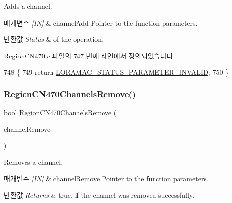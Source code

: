 Adds a channel. 


\begin{DoxyParams}{매개변수}
{\em \mbox{[}\+I\+N\mbox{]}} & channel\+Add Pointer to the function parameters.\\
\hline
\end{DoxyParams}

\begin{DoxyRetVals}{반환값}
{\em Status} & of the operation. \\
\hline
\end{DoxyRetVals}


Region\+C\+N470.\+c 파일의 747 번째 라인에서 정의되었습니다.


\begin{DoxyCode}
748 \{
749     \textcolor{keywordflow}{return} \mbox{\hyperlink{group___l_o_r_a_m_a_c_gga1d18f26b344040b3ec5c3db662919661ad0d3119f247d00e1787dda106fcb3017}{LORAMAC\_STATUS\_PARAMETER\_INVALID}};
750 \}
\end{DoxyCode}
\mbox{\label{group___r_e_g_i_o_n_c_n470_ga325aac904d27927672021106fc718f09}} 
\subsubsection{\texorpdfstring{Region\+C\+N470\+Channels\+Remove()}{RegionCN470ChannelsRemove()}}
{\footnotesize\ttfamily bool Region\+C\+N470\+Channels\+Remove (\begin{DoxyParamCaption}\item[{\mbox{\hyperlink{group___r_e_g_i_o_n_gaa37468560d2fc81a977b57a48e5d72c0}{Channel\+Remove\+Params\+\_\+t}} $\ast$}]{channel\+Remove }\end{DoxyParamCaption})}



Removes a channel. 


\begin{DoxyParams}{매개변수}
{\em \mbox{[}\+I\+N\mbox{]}} & channel\+Remove Pointer to the function parameters.\\
\hline
\end{DoxyParams}

\begin{DoxyRetVals}{반환값}
{\em Returns} & true, if the channel was removed successfully. \\
\hline
\end{DoxyRetVals}



